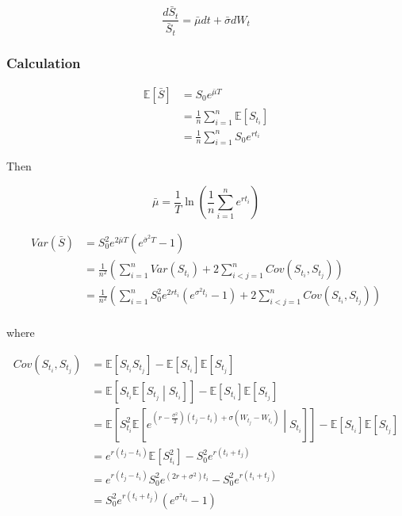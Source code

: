 \documentclass{article}
\begin{document}
\begin{equation}
	\frac{d\bar{S}_t}{\bar{S}_t} = \bar{\mu}dt + \bar{\sigma} dW_t
\end{equation}

\subsubsection{Calculation}

\begin{equation}
\begin{aligned}
	\mathbb{E}\left[\bar{S}\right] &= S_0 e^{\bar{\mu} T}\\
	&= \frac{1}{n} \sum_{i=1}^{n} \mathbb{E}\left[S_{t_i}\right]\\
	&= \frac{1}{n} \sum_{i=1}^{n} S_0 e^{r t_i}
\end{aligned}
\end{equation}

\noindent Then 

\begin{equation}	
	\bar{\mu} = \frac{1}{T} \ln\left(\frac{1}{n} \sum_{i=1}^{n} e^{r t_i}\right)
\end{equation}

\begin{equation}
\begin{aligned}
	Var\left(\bar{S}\right) &= S_0^2 e^{2\bar{\mu}T}\left( e^{\bar{\sigma}^2 T} - 1\right)\\
	&= \frac{1}{n^2} \left(\sum_{i=1}^{n} Var\left(S_{t_i}\right) + 2 \sum_{i < j = 1}^{n} Cov\left(S_{t_i}, S_{t_j}\right)\right)\\
	&= \frac{1}{n^2} \left(\sum_{i=1}^{n} S_0^2 e^{2r t_i} \left(e^{ \sigma^2t_i} -1\right)+ 2 \sum_{i < j = 1}^{n} Cov\left(S_{t_i}, S_{t_j}\right)\right)\\
\end{aligned}
\end{equation}

\noindent where 

\begin{equation}
\begin{aligned}
	Cov\left(S_{t_i}, S_{t_j}\right) &= \mathbb{E}\left[S_{t_i} S_{t_j}\right] - \mathbb{E}\left[S_{t_i} \right] \mathbb{E}\left[S_{t_j}\right]\\
	&= \mathbb{E}\left[ S_{t_i} \mathbb{E}\left[S_{t_j}  \middle | S_{t_i} \right] \right]  - \mathbb{E}\left[S_{t_i} \right] \mathbb{E}\left[S_{t_j}\right]\\
	&= \mathbb{E}\left[ S_{t_i}^2 \mathbb{E}\left[e^{\left(r - \frac{\sigma^2}{2}\right)\left(t_j - t_i\right) + \sigma \left(W_{t_j} - W_{t_i}\right)} \middle | S_{t_i} \right] \right]  - \mathbb{E}\left[S_{t_i} \right] \mathbb{E}\left[S_{t_j}\right]\\
	&= e^{r\left(t_j - t_i\right)} \mathbb{E}\left[S_{t_i}^2\right] - S_0^2 e^{r\left(t_i + t_j\right)}\\
	&= e^{r\left(t_j - t_i\right)} S_0^2 e^{\left(2r + \sigma^2\right)t_i} - S_0^2 e^{r\left(t_i + t_j\right)}\\
	&= S_0^2 e^{r\left(t_i + t_j\right)} \left( e^{ \sigma^2 t_i }  - 1\right)
\end{aligned}
\end{equation}
\end{document}
